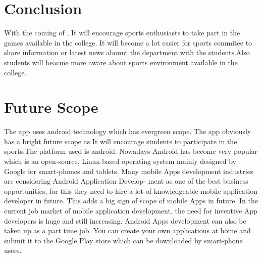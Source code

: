 \section{Conclusion}
With the coming of \appName, It will encourage sports enthusiasts to take part in the games available in the college. It will become a lot easier for sports commitee to share information or latest news abount the department with the students.Also students will beacme more aware about sports environment available in the college. 

\section{Future Scope}
The app uses android technology which has evergreen scope. The app obviously has a bright
future scope as It will encourage students to participate in the sports.The platform used is
android. Nowadays Android has become very popular which is an open-source, Linux-based
operating system mainly designed by Google for smart-phones and tablets.
Many mobile Apps development industries are considering Android Application Develop-
ment as one of the best business opportunities, for this they need to hire a lot of knowledgeable
mobile application developer in future. This adds a big sign of scope of mobile Apps in future.
In the current job market of mobile application development, the need for inventive App
developers is huge and still increasing. Android Apps development can also be taken up as
a part time job. You can create your own applications at home and submit it to the Google
Play store which can be downloaded by smart-phone users.